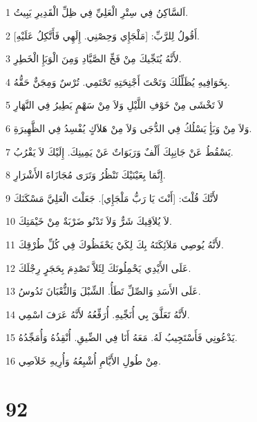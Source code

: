 \par 1 اَلسَّاكِنُ فِي سِتْرِ الْعَلِيِّ فِي ظِلِّ الْقَدِيرِ يَبِيتُ.
\par 2 أَقُولُ لِلرَّبِّ: [مَلْجَإِي وَحِصْنِي. إِلَهِي فَأَتَّكِلُ عَلَيْهِ].
\par 3 لأَنَّهُ يُنَجِّيكَ مِنْ فَخِّ الصَّيَّادِ وَمِنَ الْوَبَإِ الْخَطِرِ.
\par 4 بِخَوَافِيهِ يُظَلِّلُكَ وَتَحْتَ أَجْنِحَتِهِ تَحْتَمِي. تُرْسٌ وَمِجَنٌّ حَقُّهُ.
\par 5 لاَ تَخْشَى مِنْ خَوْفِ اللَّيْلِ وَلاَ مِنْ سَهْمٍ يَطِيرُ فِي النَّهَارِ
\par 6 وَلاَ مِنْ وَبَأٍ يَسْلُكُ فِي الدُّجَى وَلاَ مِنْ هَلاَكٍ يُفْسِدُ فِي الظَّهِيرَةِ.
\par 7 يَسْقُطُ عَنْ جَانِبِكَ أَلْفٌ وَرَبَوَاتٌ عَنْ يَمِينِكَ. إِلَيْكَ لاَ يَقْرُبُ.
\par 8 إِنَّمَا بِعَيْنَيْكَ تَنْظُرُ وَتَرَى مُجَازَاةَ الأَشْرَارِ.
\par 9 لأَنَّكَ قُلْتَ: [أَنْتَ يَا رَبُّ مَلْجَإِي]. جَعَلْتَ الْعَلِيَّ مَسْكَنَكَ
\par 10 لاَ يُلاَقِيكَ شَرٌّ وَلاَ تَدْنُو ضَرْبَةٌ مِنْ خَيْمَتِكَ.
\par 11 لأَنَّهُ يُوصِي مَلاَئِكَتَهُ بِكَ لِكَيْ يَحْفَظُوكَ فِي كُلِّ طُرْقِكَ.
\par 12 عَلَى الأَيْدِي يَحْمِلُونَكَ لِئَلاَّ تَصْدِمَ بِحَجَرٍ رِجْلَكَ.
\par 13 عَلَى الأَسَدِ وَالصِّلِّ تَطَأُ. الشِّبْلَ وَالثُّعْبَانَ تَدُوسُ.
\par 14 لأَنَّهُ تَعَلَّقَ بِي أُنَجِّيهِ. أُرَفِّعُهُ لأَنَّهُ عَرَفَ اسْمِي.
\par 15 يَدْعُونِي فَأَسْتَجِيبُ لَهُ. مَعَهُ أَنَا فِي الضِّيقِ. أُنْقِذُهُ وَأُمَجِّدُهُ.
\par 16 مِنْ طُولِ الأَيَّامِ أُشْبِعُهُ وَأُرِيهِ خَلاَصِي.

\chapter{92}

